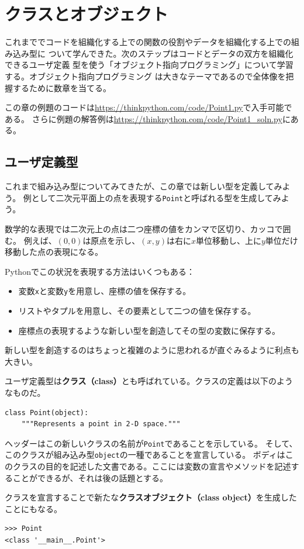 \documentclass[a4j,12pt,makeidx]{jbook}
\begin{document}
\chapter{クラスとオブジェクト}
これまででコードを組織化する上での関数の役割やデータを組織化する上での組み込み型に
ついて学んできた。次のステップはコードとデータの双方を組織化できるユーザ定義
型を使う「オブジェクト指向プログラミング」について学習する。オブジェクト指向プログラミング
は大きなテーマであるので全体像を把握するために数章を当てる。　\par
この章の例題のコードは\url{https://thinkpython.com/code/Point1.py}で入手可能である。
さらに例題の解答例は\url{https://thinkpython.com/code/Point1_soln.py}にある。
%
\section{ユーザ定義型}
これまで組み込み型についてみてきたが、この章では新しい型を定義してみよう。
例として二次元平面上の点を表現する{\tt Point}と呼ばれる型を生成してみよう。\par
数学的な表現では二次元上の点は二つ座標の値をカンマで区切り、カッコで囲む。
例えば、$(0,0)$は原点を示し、$(x,y)$は右に$x$単位移動し、上に$ y$単位だけ移動した点の表現になる。\par
Pythonでこの状況を表現する方法はいくつもある：
\begin{itemize}
\item 変数{\tt x}と変数{\tt y}を用意し、座標の値を保存する。
\item リストやタプルを用意し、その要素として二つの値を保存する。
\item 座標点の表現するような新しい型を創造してその型の変数に保存する。
\end{itemize}
新しい型を創造するのはちょっと複雑のように思われるが直ぐみるように利点も大きい。\par
ユーザ定義型は{\bf クラス（class）}とも呼ばれている。クラスの定義は以下のようなものだ。
\begin{verbatim}
class Point(object):
    """Represents a point in 2-D space."""
\end{verbatim}
ヘッダーはこの新しいクラスの名前が{\tt Point}であることを示している。
そして、このクラスが組み込み型{\tt object}の一種であることを宣言している。
ボディはこのクラスの目的を記述した文書である。ここには変数の宣言やメソッドを記述することができるが、それは後の話題とする。\par
クラスを宣言することで新たな{\bf クラスオブジェクト（class object）}を生成したことにもなる。
\begin{verbatim}
>>> Point
<class '__main__.Point'>
\end{verbatim}
\end{document}
